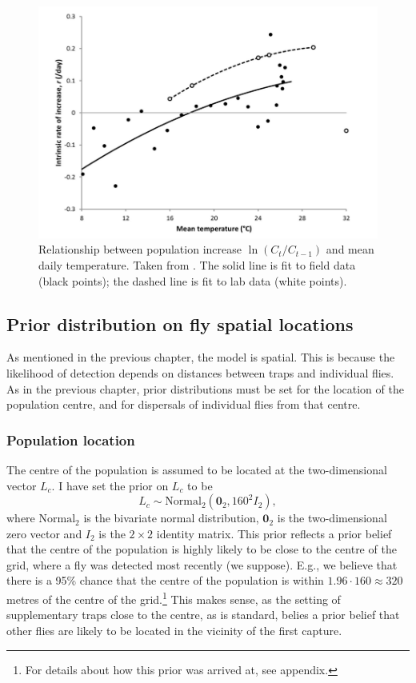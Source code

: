 \documentclass[
  oneside]{book}
\begin{document}
\begin{figure}

{\centering \includegraphics[width=0.75\linewidth]{references/ksplot} 

}

\caption{Relationship between population increase \(\ln (C_t / C_{t-1})\) and mean daily temperature. Taken from \citet{ks2019}. The solid line is fit to field data (black points); the dashed line is fit to lab data (white points).}\label{fig:ksplot}
\end{figure}

\hypertarget{prior-distribution-on-fly-spatial-locations}{%
\subsection{Prior distribution on fly spatial locations}\label{prior-distribution-on-fly-spatial-locations}}

As mentioned in the previous chapter, the model is spatial. This is because the likelihood of detection depends on distances between traps and individual flies. As in the previous chapter, prior distributions must be set for the location of the population centre, and for dispersals of individual flies from that centre.

\hypertarget{population-location}{%
\subsubsection*{Population location}\label{population-location}}

The centre of the population is assumed to be located at the two-dimensional vector \(L_c\). I have set the prior on \(L_c\) to be
\[
L_c \sim \mathrm {Normal}_2 (\mathbf 0_2, 160^2 I_2),
\]
where \(\mathrm{Normal}_2\) is the bivariate normal distribution, \(\mathbf 0_2\) is the two-dimensional zero vector and \(I_2\) is the \(2 \times 2\) identity matrix. This prior reflects a prior belief that the centre of the population is highly likely to be close to the centre of the grid, where a fly was detected most recently (we suppose). E.g., we believe that there is a 95\% chance that the centre of the population is within \(1.96 \cdot 160 \approx 320\) metres of the centre of the grid.\footnote{For details about how this prior was arrived at, see appendix.} This makes sense, as the setting of supplementary traps close to the centre, as is standard, belies a prior belief that other flies are likely to be located in the vicinity of the first capture.
\end{document}
